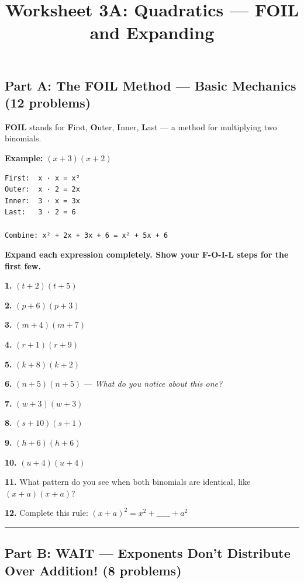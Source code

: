 \documentclass[
  11pt,
]{article}
\title{Worksheet 3A: Quadratics --- FOIL and Expanding}
\author{}
\date{}
\begin{document}
\maketitle

\hypertarget{part-a-the-foil-method-basic-mechanics-12-problems}{%
\subsection{Part A: The FOIL Method --- Basic Mechanics (12
problems)}\label{part-a-the-foil-method-basic-mechanics-12-problems}}

\textbf{FOIL} stands for \textbf{F}irst, \textbf{O}uter, \textbf{I}nner,
\textbf{L}ast --- a method for multiplying two binomials.

\textbf{Example:} \((x + 3)(x + 2)\)

\begin{verbatim}
First:  x · x = x²
Outer:  x · 2 = 2x
Inner:  3 · x = 3x
Last:   3 · 2 = 6

Combine: x² + 2x + 3x + 6 = x² + 5x + 6
\end{verbatim}

\textbf{Expand each expression completely. Show your F-O-I-L steps for
the first few.}

\textbf{1.} \((t + 2)(t + 5)\)

\textbf{2.} \((p + 6)(p + 3)\)

\textbf{3.} \((m + 4)(m + 7)\)

\textbf{4.} \((r + 1)(r + 9)\)

\textbf{5.} \((k + 8)(k + 2)\)

\textbf{6.} \((n + 5)(n + 5)\) --- \emph{What do you notice about this
one?}

\textbf{7.} \((w + 3)(w + 3)\)

\textbf{8.} \((s + 10)(s + 1)\)

\textbf{9.} \((h + 6)(h + 6)\)

\textbf{10.} \((u + 4)(u + 4)\)

\textbf{11.} What pattern do you see when both binomials are identical,
like \((x + a)(x + a)\)?

\textbf{12.} Complete this rule: \((x + a)^2 = x^2 + \_\_\_\_\_ + a^2\)

\begin{center}\rule{0.5\linewidth}{0.5pt}\end{center}

\hypertarget{part-b-wait-exponents-dont-distribute-over-addition-8-problems}{%
\subsection{Part B: WAIT --- Exponents Don't Distribute Over Addition!
(8
problems)}\label{part-b-wait-exponents-dont-distribute-over-addition-8-problems}}
\end{document}
